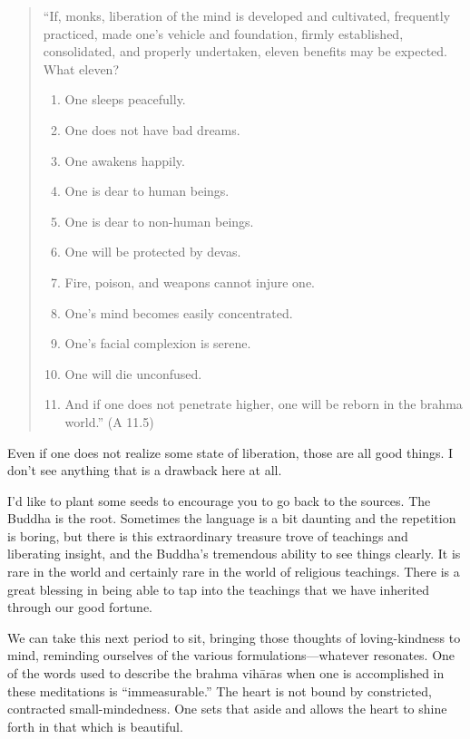 \begin{quotation}
“If, monks, liberation of the mind is developed and cultivated,
frequently practiced, made one’s vehicle and foundation, firmly
established, consolidated, and properly undertaken, eleven benefits may
be expected. What eleven?

\begin{enumerate}
\def\labelenumi{\arabic{enumi}.}
\item
  One sleeps peacefully.
\item
  One does not have bad dreams.
\item
  One awakens happily.
\item
  One is dear to human beings.
\item
  One is dear to non-human beings.
\item
  One will be protected by devas.
\item
  Fire, poison, and weapons cannot injure one.
\item
  One’s mind becomes easily concentrated.
\item
  One’s facial complexion is serene.
\item
  One will die unconfused.
\item
  And if one does not penetrate higher, one will be reborn in the brahma
  world.” (A 11.5)
\end{enumerate}
\end{quotation}

Even if one does not realize some state of liberation, those are all
good things. I don’t see anything that is a drawback here at all.

I’d like to plant some seeds to encourage you to go back to the sources.
The Buddha is the root. Sometimes the language is a bit daunting and the
repetition is boring, but there is this extraordinary treasure trove of
teachings and liberating insight, and the Buddha’s tremendous ability to
see things clearly. It is rare in the world and certainly rare in the
world of religious teachings. There is a great blessing in being able to
tap into the teachings that we have inherited through our good fortune.

We can take this next period to sit, bringing those thoughts of
loving-kindness to mind, reminding ourselves of the various
formulations—whatever resonates. One of the words used to describe the
brahma vihāras when one is accomplished in these meditations is
“immeasurable.” The heart is not bound by constricted, contracted
small-mindedness. One sets that aside and allows the heart to shine
forth in that which is beautiful.

